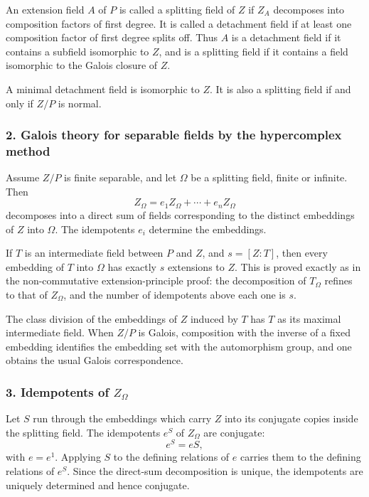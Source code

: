 \documentclass[11pt]{article}
\begin{document}
An extension field \(A\) of \(P\) is called a splitting field of \(Z\)
if \(Z_A\) decomposes into composition factors of first degree. It is
called a detachment field if at least one composition factor of first
degree splits off. Thus \(A\) is a detachment field if it contains a
subfield isomorphic to \(Z\), and is a splitting field if it contains a
field isomorphic to the Galois closure of \(Z\).

A minimal detachment field is isomorphic to \(Z\). It is also a
splitting field if and only if \(Z/P\) is normal.

\subsubsection{2. Galois theory for separable fields by the hypercomplex
method}\label{galois-theory-for-separable-fields-by-the-hypercomplex-method}

Assume \(Z/P\) is finite separable, and let \(\Omega\) be a splitting
field, finite or infinite. Then \[
  Z_\Omega=e_1Z_\Omega+
\cdots+e_nZ_\Omega
\] decomposes into a direct sum of fields corresponding to the distinct
embeddings of \(Z\) into \(\Omega\). The idempotents \(e_i\) determine
the embeddings.

If \(T\) is an intermediate field between \(P\) and \(Z\), and
\(s=[Z:T]\), then every embedding of \(T\) into \(\Omega\) has exactly
\(s\) extensions to \(Z\). This is proved exactly as in the
non-commutative extension-principle proof: the decomposition of
\(T_\Omega\) refines to that of \(Z_\Omega\), and the number of
idempotents above each one is \(s\).

The class division of the embeddings of \(Z\) induced by \(T\) has \(T\)
as its maximal intermediate field. When \(Z/P\) is Galois, composition
with the inverse of a fixed embedding identifies the embedding set with
the automorphism group, and one obtains the usual Galois correspondence.

\subsubsection{\texorpdfstring{3. Idempotents of
\(Z_\Omega\)}{3. Idempotents of Z\_\textbackslash Omega}}\label{idempotents-of-z_omega}

Let \(S\) run through the embeddings which carry \(Z\) into its
conjugate copies inside the splitting field. The idempotents \(e^S\) of
\(Z_\Omega\) are conjugate: \[
  e^S=eS,
\] with \(e=e^1\). Applying \(S\) to the defining relations of \(e\)
carries them to the defining relations of \(e^S\). Since the direct-sum
decomposition is unique, the idempotents are uniquely determined and
hence conjugate.
\end{document}

